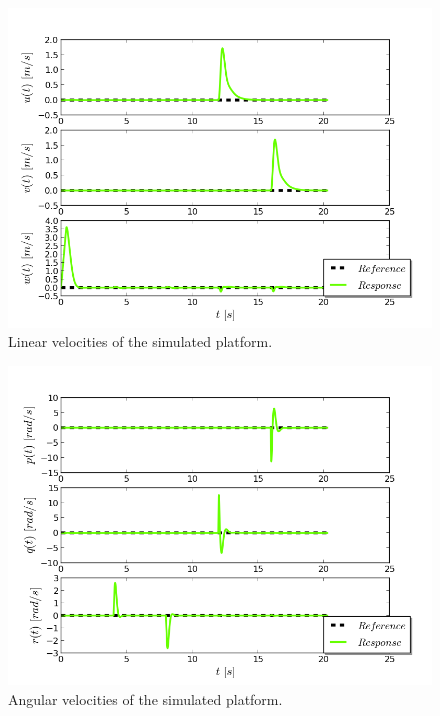 \begin{figure}[h!]
\centering
\includegraphics[scale=0.7]{Images/Chapter5/ardrone/lin_velocity_control.png}
\caption{Linear velocities of the simulated platform. }
\label{fig:ardrone_lin_vel}
\end{figure}

\begin{figure}[h!]
\centering
\includegraphics[scale=0.7]{Images/Chapter5/ardrone/ang_velocity_control.png}
\caption{Angular velocities of the simulated platform.}
\label{fig:ardrone_ang_vel}
\end{figure}

